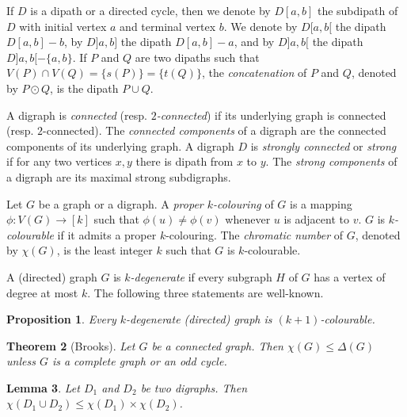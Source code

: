 \documentclass[utf8,10pt]{article}
\theoremstyle{plain}
\newtheorem{theorem}{Theorem}
\newtheorem{lemma}[theorem]{Lemma}
\newtheorem{proposition}[theorem]{Proposition}
\theoremstyle{definition}
\theoremstyle{remark}
\begin{document}
If $D$ is a dipath or a directed cycle, then we denote by $D[a,b]$ the subdipath of $D$ with initial vertex $a$ and terminal vertex $b$.
We denote by $D[a,b[$ the dipath $D[a,b] -b$, by $D]a,b]$ the dipath $D[a,b] -a$, and by $D]a,b[$ the dipath $D]a,b[ -\{a,b\}$.
If $P$ and $Q$ are two dipaths such that $V(P)\cap V(Q) =\{s(P)\}=\{t(Q)\}$, the {\it concatenation} of $P$ and $Q$, denoted by $P\odot Q$, is the dipath $P\cup Q$. 

\smallskip


A digraph is {\it connected} (resp. {\it $2$-connected}) if its underlying graph is connected (resp. $2$-connected).
The {\it connected components} of a digraph are the connected components of its underlying graph.
A digraph $D$ is {\it strongly connected} or {\it strong} if for any two vertices $x,y$ there is dipath from $x$ to $y$.
The {\it strong components} of a digraph are its maximal strong subdigraphs.

\smallskip

Let $G$ be a graph or a digraph.
A {\it proper $k$-colouring} of $G$ is a mapping $\phi: V(G) \rightarrow [k]$ such that $\phi(u) \neq \phi(v)$ whenever $u$ is adjacent to $v$. 
$G$ is {\it $k$-colourable} if it admits a proper $k$-colouring. The {\it chromatic number} of $G$, denoted by $\chi(G)$, is the least integer $k$
such that $G$ is $k$-colourable. 


A (directed) graph $G$ is {\it $k$-degenerate} if every subgraph $H$ of $G$ has a vertex of degree at most $k$.
The following three statements are well-known.
\begin{proposition}\label{prop:deg}
Every $k$-degenerate (directed) graph is $(k+1)$-colourable.
\end{proposition}

\begin{theorem}[Brooks]\label{thm:brooks}
Let $G$ be a connected graph.
Then $\chi(G)\leq \Delta(G)$ unless $G$ is a complete graph or an odd cycle.
\end{theorem}

\begin{lemma}\label{lem:decomp}
Let $D_1$ and $D_2$ be two digraphs.
Then $\chi(D_1\cup D_2) \leq \chi(D_1)\times \chi(D_2)$.
\end{lemma}
\end{document}
